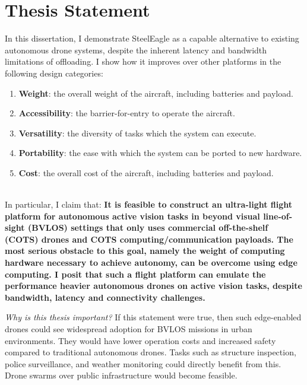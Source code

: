\section{Thesis Statement}
In this dissertation, I demonstrate SteelEagle as a capable alternative to existing autonomous drone systems, despite the inherent latency and bandwidth limitations of offloading. I show how it improves over other platforms in the following design categories:

\begin{enumerate}
\item \textbf{Weight}: the overall weight of the aircraft, including batteries and payload.
\item \textbf{Accessibility}: the barrier-for-entry to operate the aircraft. 
\item \textbf{Versatility}: the diversity of tasks which the system can execute.
\item \textbf{Portability}: the ease with which the system can be ported to new hardware.
\item \textbf{Cost}: the overall cost of the aircraft, including batteries and payload.
\end{enumerate}
\\
In particular, I claim that:
\newpage
\textbf{It is feasible to construct an ultra-light flight platform for autonomous active vision tasks in beyond visual line-of-sight (BVLOS) settings that only uses commercial off-the-shelf (COTS) drones and COTS computing/communication payloads. The most serious obstacle to this goal, namely the weight of computing hardware necessary to achieve autonomy, can be overcome using edge computing. I posit that such a flight platform can emulate the performance heavier autonomous drones on active vision tasks, despite bandwidth, latency and connectivity challenges.}

\textit{Why is this thesis important?} If this statement were true, then such edge-enabled drones could see widespread adoption for BVLOS missions in urban environments. They would have lower operation costs and increased safety compared to traditional autonomous drones. Tasks such as structure inspection, police surveillance, and weather monitoring could directly benefit from this. Drone swarms over public infrastructure would become feasible.

